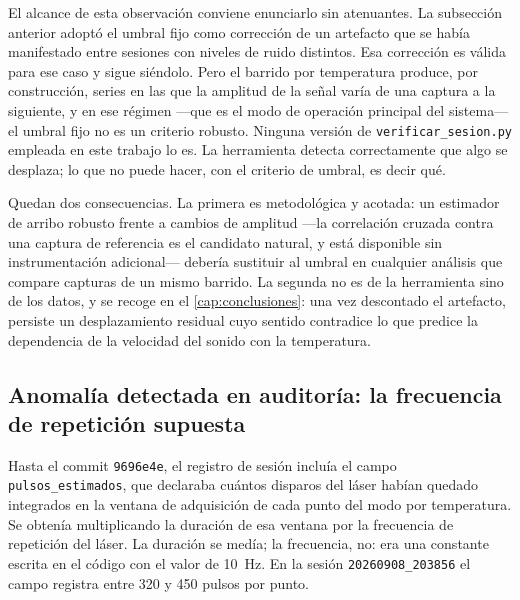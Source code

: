 El alcance de esta observación conviene enunciarlo sin atenuantes. La
subsección anterior adoptó el umbral fijo como corrección de un
artefacto que se había manifestado entre sesiones con niveles de ruido
distintos. Esa corrección es válida para ese caso y sigue siéndolo.
Pero el barrido por temperatura produce, por construcción, series en
las que la amplitud de la señal varía de una captura a la siguiente, y
en ese régimen ---que es el modo de operación principal del sistema---
el umbral fijo no es un criterio robusto. Ninguna versión de
\texttt{verificar\_sesion.py} empleada en este trabajo lo es. La
herramienta detecta correctamente que algo se desplaza; lo que no puede
hacer, con el criterio de umbral, es decir qué.

Quedan dos consecuencias. La primera es metodológica y acotada: un
estimador de arribo robusto frente a cambios de amplitud ---la
correlación cruzada contra una captura de referencia es el candidato
natural, y está disponible sin instrumentación adicional--- debería
sustituir al umbral en cualquier análisis que compare capturas de un
mismo barrido. La segunda no es de la herramienta sino de los datos, y
se recoge en el \cref{cap:conclusiones}: una vez descontado el
artefacto, persiste un desplazamiento residual cuyo sentido contradice
lo que predice la dependencia de la velocidad del sonido con la
temperatura.

\subsection{Anomalía detectada en auditoría: la frecuencia de
repetición supuesta}
\label{sec:falla_laserhz}

Hasta el commit \texttt{9696e4e}, el registro de sesión incluía el
campo \texttt{pulsos\_estimados}, que declaraba cuántos disparos del
láser habían quedado integrados en la ventana de adquisición de cada
punto del modo por temperatura. Se obtenía multiplicando la duración de
esa ventana por la frecuencia de repetición del láser. La duración se
medía; la frecuencia, no: era una constante escrita en el código con el
valor de \SI{10}{\hertz}. En la sesión \texttt{20260908\_203856} el
campo registra entre 320 y 450 pulsos por punto.

